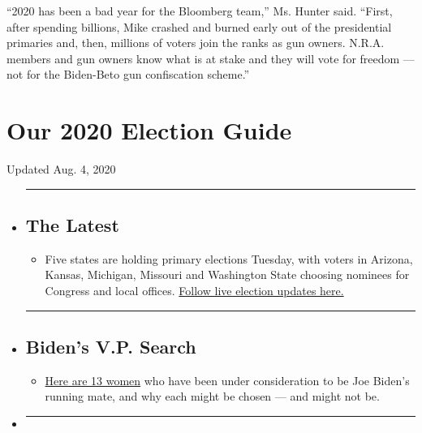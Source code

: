 ``2020 has been a bad year for the Bloomberg team,'' Ms. Hunter said.
``First, after spending billions, Mike crashed and burned early out of
the presidential primaries and, then, millions of voters join the ranks
as gun owners. N.R.A. members and gun owners know what is at stake and
they will vote for freedom --- not for the Biden-Beto gun confiscation
scheme.''

\hypertarget{our-2020-election-guide}{%
\section{Our 2020 Election Guide}\label{our-2020-election-guide}}

Updated Aug. 4, 2020

\begin{itemize}
\item
  \begin{center}\rule{0.5\linewidth}{\linethickness}\end{center}

  \hypertarget{the-latest}{%
  \subsection{The Latest}\label{the-latest}}

  \begin{itemize}
  \tightlist
  \item
    Five states are holding primary elections Tuesday, with voters in
    Arizona, Kansas, Michigan, Missouri and Washington State choosing
    nominees for Congress and local offices.
    \href{https://www.nytimes.com/2020/08/04/us/elections/primary-election-michigan-arizona-kansas.html?action=click\&pgtype=Article\&state=default\&region=BELOW_MAIN_CONTENT\&context=storylines_guide}{Follow
    live election updates here.}
  \end{itemize}
\item
  \begin{center}\rule{0.5\linewidth}{\linethickness}\end{center}

  \hypertarget{bidens-vp-search}{%
  \subsection{Biden's V.P. Search}\label{bidens-vp-search}}

  \begin{itemize}
  \tightlist
  \item
    \href{https://www.nytimes.com/article/biden-vice-president-2020.html?action=click\&pgtype=Article\&state=default\&region=BELOW_MAIN_CONTENT\&context=storylines_guide}{Here
    are 13 women} who have been under consideration to be Joe Biden's
    running mate, and why each might be chosen --- and might not be.
  \end{itemize}
\item
  \begin{center}\rule{0.5\linewidth}{\linethickness}\end{center}


\end{itemize}
